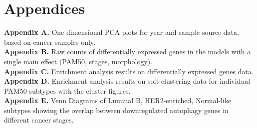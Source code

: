 \documentclass[10pt, openright,oneside]{book}
\begin{document}
\cleardoublepage
{}
\printbibliography



\cleardoublepage
{}

\chapter*{Appendices}


   \textbf{Appendix A. }One dimensional PCA plots for year and sample source data, based on cancer samples only.\\
   
   
   \textbf{Appendix B. }Raw counts of differentially expressed genes in the models with a single main effect (PAM50, stages, morphology).\\
   
   
   \textbf{Appendix C. }Enrichment analysis results on differentially expressed genes data.\\
   
   
   \textbf{Appendix D. }Enrichment analysis results on soft-clustering data for individual PAM50 subtypes with the cluster figures.\\
   
   
   \textbf{Appendix E. } Venn Diagrams of Luminal B, HER2-enriched, Normal-like subtypes showing the overlap between downregulated autophagy genes in different cancer stages. \\







\backmatter
\end{document}
